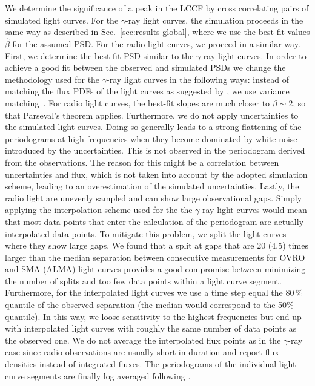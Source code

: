 \documentclass[twocolumn,linenumbers]{aastex62}
\newcommand{\gray}{$\gamma$-ray\xspace}
\begin{document}
We determine the significance of a peak in the LCCF by cross correlating pairs of simulated light curves. 
For the \gray light curves, the simulation proceeds in the same way as described in Sec.~\ref{sec:results-global}, where we use the best-fit values $\hat{\beta}$ for the assumed PSD.
For the radio light curves, we proceed in a similar way. 
First, we determine the best-fit PSD similar to the \gray light curves. 
In order to achieve a good fit between the observed and simulated PSDs we change the methodology used for the \gray light curves in the following ways:
instead of matching the flux PDFs of the light curves as suggested by \citet{2013MNRAS.433..907E}, we use variance matching~\citep{2014MNRAS.445..437M}. For radio light curves, the best-fit slopes are much closer to $\beta \sim 2$, so that Parseval's theorem applies.
Furthermore, we do not apply uncertainties to the simulated light curves. 
Doing so generally leads to a strong flattening of the periodograms at high frequencies when they become dominated by white noise introduced by the uncertainties. 
This is not observed in the periodogram derived from the observations. 
The reason for this might be a correlation between uncertainties and flux, which is not taken into account by the adopted simulation scheme, leading to an overestimation of the simulated uncertainties.
Lastly, the radio light are unevenly sampled and can show large observational gaps. 
Simply applying the interpolation scheme used for the the \gray light curves would mean that most data points that enter the calculation of the periodogram are actually interpolated data points. 
To mitigate this problem, we split the light curves where they show large gaps. 
We found that a split at gaps that are 20 (4.5) times larger than the median separation between consecutive measurements for OVRO and SMA (ALMA) light curves provides a good compromise between minimizing the number of splits and too few data points within a light curve segment. 
Furthermore, for the interpolated light curves we use a time step equal the 80\,\% quantile of the observed separation (the median would correspond to the 50\% quantile). 
In this way, we loose sensitivity to the highest frequencies but end up with interpolated light curves with roughly the same number of data points as the observed one. 
We do not average the interpolated flux points as in the \gray case since radio observations are usually short in duration and report flux densities instead of integrated fluxes. 
The periodograms of the individual light curve segments are finally log averaged following \citet{1993MNRAS.261..612P}.
\end{document}
